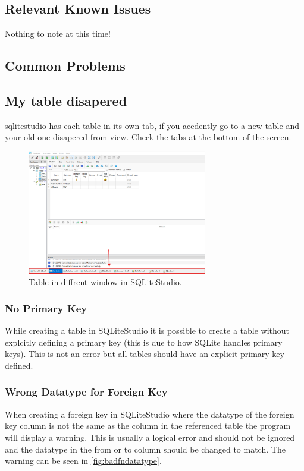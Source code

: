 \documentclass[a4paper,11pt,oneside]{article}
\begin{document}
\begin{sloppypar}
\subsection{Relevant Known Issues}
\label{sqliteStudioKnownIssues}
Nothing to note at this time!

\subsection{Common Problems}
\label{sqliteStudioCommonProblems}

\subsection {My table disapered}
\label{sqliteStudioTableDisapered}
sqlitestudio has each table in its own tab, if you acedently go to a new table and your old one disapered from view. Check the tabs at the bottom of the screen.
\begin{figure}[!htb]
  \centering
  \includegraphics[width=0.7\textwidth]{sqlitestudio/common_problems/table_disapered.png}
  \caption{Table in diffrent window in SQLiteStudio.}
  \label{fig:tabledisapered}
\end{figure}


\subsubsection{No Primary Key}
\label{sqliteStudioNoPrimaryKey}
While creating a table in SQLiteStudio it is possible to create a table without explcitly defining a primary key (this is due to how SQLite handles primary keys). This is not an error but all tables should have an explicit primary key defined.


\subsubsection{Wrong Datatype for Foreign Key}
\label{sqliteStudioWrongDatatypeForeignKey}
When creating a foreign key in SQLiteStudio where the datatype of the foreign key column is not the same as the column in the referenced table the program will display a warning. This is usually a logical error and should not be ignored and the datatype in the from or to column should be changed to match. The warning can be seen in \autoref{fig:badfndatatype}.



\end{sloppypar}
\end{document}
